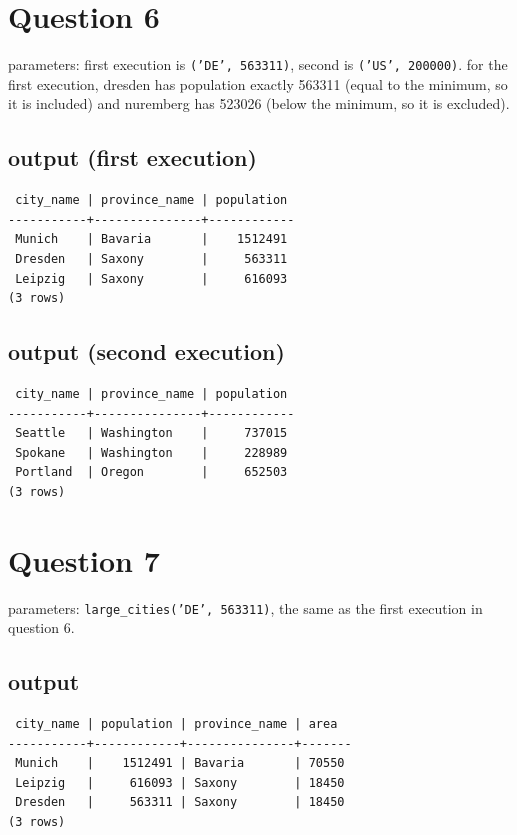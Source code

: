 \documentclass[11pt]{article}
\begin{document}
\section*{Question 6}

parameters: first execution is \texttt{('DE', 563311)}, second is \texttt{('US', 200000)}.
for the first execution, dresden has population exactly 563311 (equal to the minimum, so it is
included) and nuremberg has 523026 (below the minimum, so it is excluded).

\subsection*{output (first execution)}
{\small
\begin{verbatim}
 city_name | province_name | population
-----------+---------------+------------
 Munich    | Bavaria       |    1512491
 Dresden   | Saxony        |     563311
 Leipzig   | Saxony        |     616093
(3 rows)
\end{verbatim}
}

\subsection*{output (second execution)}
{\small
\begin{verbatim}
 city_name | province_name | population
-----------+---------------+------------
 Seattle   | Washington    |     737015
 Spokane   | Washington    |     228989
 Portland  | Oregon        |     652503
(3 rows)
\end{verbatim}
}

\section*{Question 7}

parameters: \texttt{large\_cities('DE', 563311)}, the same as the first execution in question 6.

\subsection*{output}
{\small
\begin{verbatim}
 city_name | population | province_name | area
-----------+------------+---------------+-------
 Munich    |    1512491 | Bavaria       | 70550
 Leipzig   |     616093 | Saxony        | 18450
 Dresden   |     563311 | Saxony        | 18450
(3 rows)
\end{verbatim}
}
\end{document}
